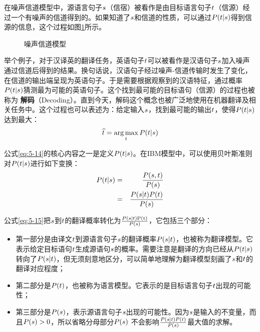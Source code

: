 \parinterval 在噪声信道模型中，源语言句子${s}$（信宿）被看作是由目标语言句子${t}$（信源）经过一个有噪声的信道得到的。如果知道了${s}$和信道的性质，可以通过${P}({t}|{s})$得到信源的信息，这个过程如图\ref{fig:5-13}所示。

\begin{figure}[htp]
    \centering

    \caption{噪声信道模型}
    \label{fig:5-13}
\end{figure}

\parinterval 举个例子，对于汉译英的翻译任务，英语句子${t}$可以被看作是汉语句子${s}$加入噪声通过信道后得到的结果。换句话说，汉语句子经过噪声-信道传输时发生了变化，在信道的输出端呈现为英语句子。于是需要根据观察到的汉语特征，通过概率${P}({t}|{s})$猜测最为可能的英语句子。这个找到最可能的目标语句（信源）的过程也被称为
{\small\sffamily\bfseries{解码}}（Decoding）。直到今天，解码这个概念也被广泛地使用在机器翻译及相关任务中。这个过程也可以表述为：给定输入${s}$，找到最可能的输出${t}$，使得${P}({t}|{s})$达到最大：
\begin{eqnarray}
\widehat{{t}}=\operatorname*{arg\,max}_{{t}}{P}({t}|{s})
\label{eq:5-14}
\end{eqnarray}

\parinterval 公式\eqref{eq:5-14}的核心内容之一是定义${P}({t}|{s})$。在IBM模型中，可以使用贝叶斯准则对${P}({t}|{s})$进行如下变换：
\begin{eqnarray}
{P}({t}|{s}) & = &\frac{{P}({s},{t})}{{P}({s})} \nonumber \\
                       & = & \frac{{P}({s}|{t}){P}({t})}{{P}({s})}
\label{eq:5-15}
\end{eqnarray}

\parinterval 公式\eqref{eq:5-15}把${s}$到${t}$的翻译概率转化为$\frac{{P}({s}|{t})\textrm{P(t)}}{{P}({s})}$，它包括三个部分：

\begin{itemize}
\vspace{0.5em}
\item 第一部分是由译文${t}$到源语言句子${s}$的翻译概率${P}({s}|{t})$，也被称为翻译模型。它表示给定目标语句${t}$生成源语句${s}$的概率。需要注意是翻译的方向已经从${P}({t}|{s})$转向了${P}({s}|{t})$，但无须刻意地区分，可以简单地理解为翻译模型刻画了${s}$和${t}$的翻译对应程度；
\vspace{0.5em}
\item 第二部分是${P}({t})$，也被称为语言模型。它表示的是目标语言句子${t}$出现的可能性；
\vspace{0.5em}
\item 第三部分是${P}({s})$，表示源语言句子${s}$出现的可能性。因为${s}$是输入的不变量，而且${P}({s}) > 0$，所以省略分母部分${P}({s})$ 不会影响$\frac{{P}({s}|{t}){P}({t})}{{P}({s})}$最大值的求解。
\vspace{0.5em}
\end{itemize}

